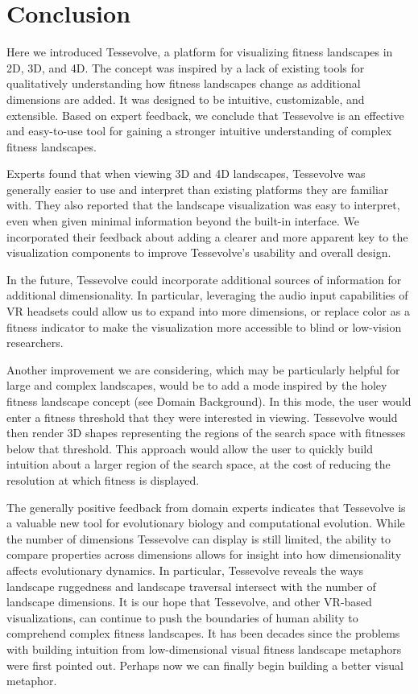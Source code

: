 \section{Conclusion}
Here we introduced Tessevolve, a platform for visualizing fitness landscapes in 2D, 3D, and 4D. The concept was inspired by a lack of existing tools for qualitatively understanding how fitness landscapes change as additional dimensions are added. It was designed to be intuitive, customizable, and extensible. Based on expert feedback, we conclude that Tessevolve is an effective and easy-to-use tool for gaining a stronger intuitive understanding of complex fitness landscapes.

Experts found that when viewing 3D and 4D landscapes, Tessevolve was generally easier to use and interpret than existing platforms they are familiar with. They also reported that the landscape visualization was easy to interpret, even when given minimal information beyond the built-in interface. We incorporated their feedback about adding a clearer and more apparent key to the visualization components to improve Tessevolve's usability and overall design. 

In the future, Tessevolve could incorporate additional sources of information for additional dimensionality. In particular, leveraging the audio input capabilities of VR headsets could allow us to expand into more dimensions, or replace color as a fitness indicator to make the visualization more accessible to blind or low-vision researchers.

Another improvement we are considering, which may be particularly helpful for large and complex landscapes, would be to add a mode inspired by the holey fitness landscape concept (see Domain Background). In this mode, the user would enter a fitness threshold that they were interested in viewing. Tessevolve would then render 3D shapes representing the regions of the search space with fitnesses below that threshold. This approach would allow the user to quickly build intuition about a larger region of the search space, at the cost of reducing the resolution at which fitness is displayed.

The generally positive feedback from domain experts indicates that Tessevolve is a valuable new tool for evolutionary biology and computational evolution. While the number of dimensions Tessevolve can display is still limited, the ability to compare properties across dimensions allows for insight into how dimensionality affects evolutionary dynamics. In particular, Tessevolve reveals the ways landscape ruggedness and landscape traversal intersect with the number of landscape dimensions. It is our hope that Tessevolve, and other VR-based visualizations, can continue to push the boundaries of human ability to comprehend complex fitness landscapes. It has been decades since the problems with building intuition from low-dimensional visual fitness landscape metaphors were first pointed out. Perhaps now we can finally begin building a better visual metaphor.